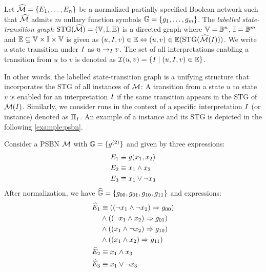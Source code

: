\begin{definition}
	Let $\widehat{\mathcal{M}} = \{ E_1, \ldots, E_n \}$ be a normalized partially specified Boolean network such that $\widehat{\mathcal{M}}$ admits $m$ nullary function symbols $\mathbb{G} = \{g_1, \ldots, g_m \}$. The \emph{labelled state-transition graph} $\text{\upshape STG}(\widehat{\mathcal{M}}) = (\mathbb{V}, \mathbb{I}, \mathbb{E})$ is a directed graph where $\mathbb{V} = \mathbb{B}^n$, $\mathbb{I} = \mathbb{B}^m$ and $\mathbb{E} \subseteq \mathbb{V} \times \mathbb{I} \times \mathbb{V}$ is given as $(u, I, v) \in \mathbb{E} \Leftrightarrow (u,v) \in \mathbb{E}(\text{\upshape STG}(\widehat{\mathcal{M}}(I)))$. We write a state transition under $I$ as $u \to_{I} v$. The set of all interpretations enabling a transition from $u$ to $v$ is denoted as $\mathcal{I}(u,v) = \{I \mid (u, I, v) \in \mathbb{E}\}$.
\end{definition}

In other words, the labelled state-transition graph is a unifying structure that incorporates the STG of all instances of $\mathcal{M}$: A transition from a state $u$ to state $v$ is enabled for an interpretation $I$ if the same transition appears in the STG of $\mathcal{M}(I)$. Similarly, we consider \PBN{} runs in the context of a specific interpretation $I$ (or instance) denoted as $\Pi_{I}$. An example of a \PBN{} instance and its STG is depicted in the following \autoref{example:psbn}. 

\begin{example}
	\label{example:psbn}
	Consider a PSBN $\mathcal{M}$ with $\mathbb{G} = \{ g^{(2)}\}$ and given by three expressions: 
    \begin{align*}
    E_1 &\equiv g(x_1, x_2) \\
    E_2 &\equiv x_1 \land x_3 \\
    E_3 &\equiv x_1 \lor \neg x_3
    \end{align*}
    After normalization, we have $\widehat{\mathbb{G}} = \{ g_{00}, g_{01}, g_{10}, g_{11} \}$ and expressions:
    \begin{align*}
        \widehat{E}_1 &\equiv ((\neg x_1 \land \neg x_2) \Rightarrow g_{00}) \\
        &\land ((\neg x_1 \land x_2) \Rightarrow g_{01}) \\
        &\land ((x_1 \land \neg x_2) \Rightarrow g_{10}) \\
        &\land ((x_1 \land x_2) \Rightarrow g_{11}) \\
        \widehat{E}_2 &\equiv x_1 \land x_3 \\
        \widehat{E}_3 &\equiv x_1 \lor \neg x_3
    \end{align*}
\end{example}


